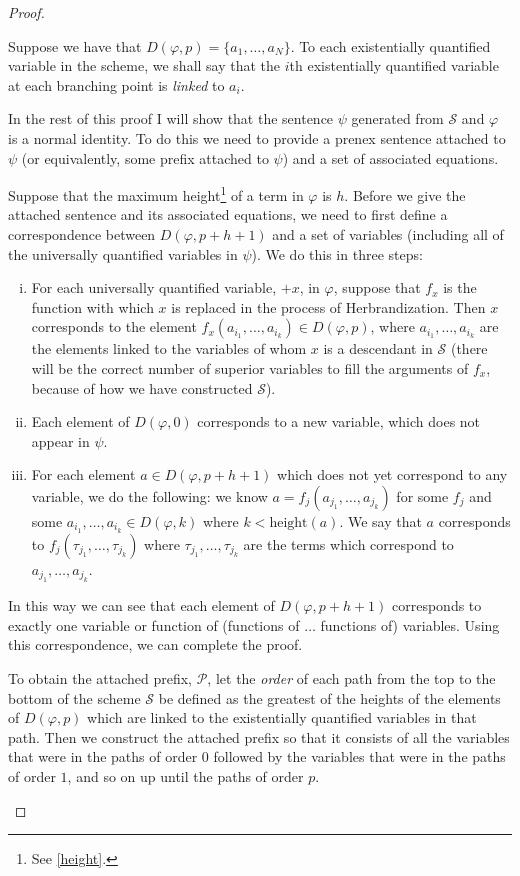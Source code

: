 \documentclass[a4paper,12pt]{report}
\theoremstyle{definition}
\begin{document}
\begin{proof}
\begin{enumerate}[(i)]
Suppose we have that $D(\varphi, p) = \{ a_1, \ldots, a_N \} $. To each existentially quantified variable in the scheme, we shall say that the $i$th existentially quantified variable at each branching point is \emph{linked} to $a_i$.

In the rest of this proof I will show that the sentence $\psi$ generated from $\mathcal{S}$ and $\varphi$ is a normal identity. To do this we need to provide a prenex sentence attached to $\psi$ (or equivalently, some prefix attached to $\psi$) and a set of associated equations.

Suppose that the maximum height\footnote{See \ref{height}.} of a term in $\varphi$ is $h$. Before we give the attached sentence and its associated equations, we need to first define a correspondence between $D(\varphi, p + h +1)$ and a set of variables (including all of the universally quantified variables in $\psi$). We do this in three steps:
\begin{enumerate}[(i)]
\item For each universally quantified variable, $+x$, in $\varphi$, suppose that $f_x$ is the function with which $x$ is replaced in the process of Herbrandization. Then $x$ corresponds to the element $f_x (a_{i_1}, \ldots, a_{i_k}) \in D(\varphi, p)$, where $a_{i_1}, \ldots, a_{i_k}$ are the elements linked to the variables of whom $x$ is a descendant in $\mathcal{S}$ (there will be the correct number of superior variables to fill the arguments of $f_x$, because of how we have constructed $\mathcal{S}$).
\item Each element of $D(\varphi, 0)$ corresponds to a new variable, which does not appear in $\psi$.
\item For each element $a \in D(\varphi, p + h +1)$ which does not yet correspond to any variable, we do the following: we know $a = f_j(a_{j_1}, \ldots, a_{j_k})$ for some $f_j$ and some $a_{i_1}, \ldots, a_{i_k} \in D(\varphi, k)$ where $k < \mbox{height}(a) $. We say that $a$ corresponds to $f_j(\tau_{j_1}, \ldots, \tau_{j_k})$ where $\tau_{j_1}, \ldots, \tau_{j_k}$ are the terms which correspond to $a_{j_1}, \ldots, a_{j_k}$.
\end{enumerate}

In this way we can see that each element of $D(\varphi, p + h +1)$ corresponds to exactly one variable or function of (functions of $\ldots$ functions of) variables. Using this correspondence, we can complete the proof.

To obtain the attached prefix, $\mathcal{P}$, let the \emph{order} of each path from the top to the bottom of the scheme $\mathcal{S}$ be defined as the greatest of the heights of the elements of $D(\varphi, p)$ which are linked to the existentially quantified variables in that path. Then we construct the attached prefix so that it consists of all the variables that were in the paths of order $0$ followed by the variables that were in the paths of order $1$, and so on up until the paths of order $p$.


\end{enumerate}
\end{proof}
\end{document}
